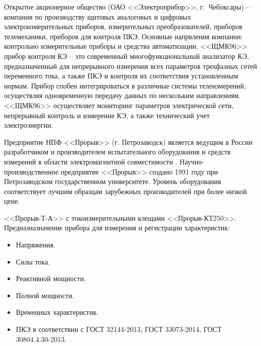 Открытое акционерное общество (ОАО <<Электроприбор>>, г.~Чебоксары) – компания по производству щитовых аналоговых и цифровых электроизмерительных приборов, измерительныз преобразователей, приборов телемеханики, приборов для контроля ПКЭ. Основные напрвления компании: контрольно измерительные приборы и средства автоматизации.
<<ЩМК96>> прибор контроля КЭ – это современный многофункциональный анализатор КЭ, предназначенный для непрерывного измерения всех параметров трехфазных сетей переменного тока, а также ПКЭ и контроля их соответствия установленным нормам. Прибор спобен интегрироваться в различные системы телеизмерений, осуществляя одновременную передачу данных по нескольким направлениям. <<ЩМК96>> осуществляет мониторинг параметров электрической сети, непрерывный контроль и измерение КЭ, а также технический учет электроэнергии.

Предприятие НПФ <<Прорыв>> (г. Петрозаводск) является ведущим в России разработчиком и производителем испытательного оборудования и средств измерений в области электромагнитной совместимости \cite{прорыв}. 
Научно-производственное предприятие <<Прорыв>> создано 1991 году при Петрозаводском государственном университете. Уровень оборудования соответствует лучшим образцам зарубежных производителей при более низкой цене.

<<Прорыв-Т-А>> с токоизмерительными клещами <<Прорыв-КТ250>>.
Предназназначение прибора для измерения и регистрации характеристик:
\begin{itemize}
	\item Напряжения.
	\item Силы тока.
	\item Реактивной мощности.
	\item Полной мощности.
	\item Временных характеристик.
	\item ПКЭ в соответствии с ГОСТ 32144-2013, ГОСТ 33073-2014, ГОСТ 30804.4.30-2013.
\end{itemize}


